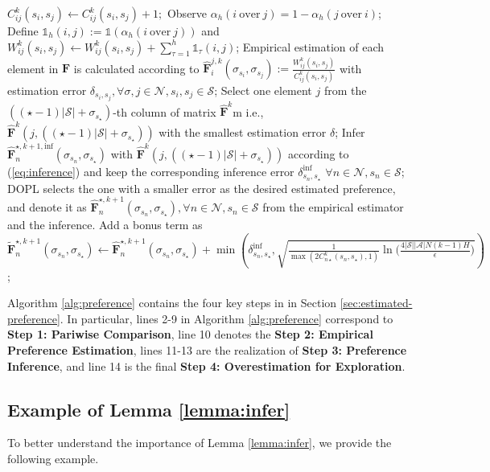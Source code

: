 \documentclass{article} %
\def\eqref#1{equation~\ref{#1}}
\newcommand{\DOPL}{\textsc{DOPL}\xspace}
\newcommand{\I}{\sigma}
\newcommand{\bF}{\mathbf{F}}
\newcommand{\cA}{\mathcal{A}}
\newcommand{\cS}{\mathcal{S}}
\newcommand{\cN}{\mathcal{N}}
\renewcommand{\eqref}[1]{(\ref{#1})}
\begin{document}
{\begin{algorithm}
\begin{algorithmic}[1]
    \FOR{$i,j \in \cA^h$ do}
    \STATE $C_{ij}^k(s_i, s_j)\leftarrow C_{ij}^k(s_i, s_j)+1;$
    \STATE Observe $\alpha_h(i ~\text{over}~ j) = 1 - \alpha_h(j~\text{over}~i)$;
        \STATE Define $\mathds{1}_h(i,j) := \mathds{1}(\alpha_h(i~ \text{over}~j))$ and $W_{ij}^k(s_i, s_j) \leftarrow W_{ij}^k(s_i, s_j)+\sum_{\tau=1}^h \mathds{1}_\tau(i,j)$;     
    \ENDFOR
\ENDFOR
\STATE Empirical estimation of each element in $\bF$ is calculated according to $\hat{\bF}_i^{j,k}(\sigma_{s_i}, \sigma_{s_j}) := \frac{W_{ij}^k(s_i, s_j)}{C^k_{ij}(s_i, s_j)}$ with estimation error $\delta_{s_i, s_j}, \forall \I, j\in\cN, s_i, s_j\in\cS$;
\STATE Select one element $j$ from the $((\star-1)|\cS|+\I_{s_\star})$-th column of matrix $\hat{\bF}^k$m i.e., $\hat{\bF}^k(j, ((\star-1)|\cS|+\I_{s_\star}))$ with the smallest estimation error $\delta$;
\STATE Infer $\hat{\bF}_n^{\star,k+1, \text{inf}}(\I_{s_n}, \I_{s_\star}) $ with $\hat{\bF}^k(j, ((\star-1)|\cS|+\I_{s_\star}))$ according to \eqref{eq:inference} and keep the corresponding inference error $\delta^{\text{inf}}_{s_n, s_{\star}}$ $\forall n\in\cN, s_n\in\cS$; 
\STATE \DOPL selects the one with a smaller error as the desired estimated preference, and denote it as $\hat{\bF}_n^{\star, k+1}(\I_{s_n}, \I_{s_\star}), \forall n\in\cN, s_n\in\cS$ from the empirical estimator and the inference.
        \STATE Add a bonus term as $\tilde{\bF}_n^{\star, k+1}(\I_{s_n}, \I_{s_\star})\leftarrow \hat{\bF}_n^{\star, k+1}(\I_{s_n}, \I_{s_\star}) + \min\left(\delta^{\text{inf}}_{s_n, s_{\star}},\sqrt{\frac{1}{\max(2C_{n\star}^k(s_n, s_\star),1)}\ln\!\Big(\frac{4|\cS||\cA|N(k\!-\!1)H}{\epsilon}\Big)}\right)$;

\end{algorithmic}
\end{algorithm}

Algorithm \ref{alg:preference} contains the four key steps in in Section \ref{sec:estimated-preference}.
In particular, lines 2-9 in Algorithm \ref{alg:preference} correspond to \textbf{Step  1: Pariwise Comparison}, line 10 denotes the \textbf{Step 2: Empirical Preference Estimation}, lines 11-13 are the realization of \textbf{Step 3: Preference Inference}, and line 14  is the final  \textbf{Step 4: Overestimation for Exploration}. 

\subsection{Example of Lemma \ref{lemma:infer}}\label{sec:B-1}
To better understand the importance of Lemma \ref{lemma:infer}, we provide the following example. 

}
\end{document}
